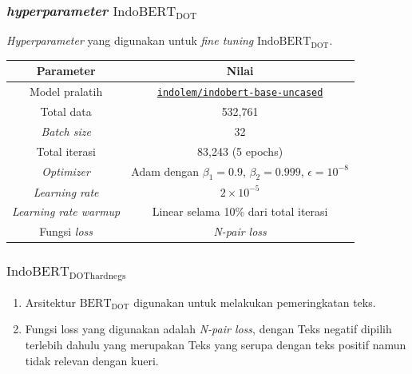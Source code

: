\documentclass[10pt]{beamer}
\newcommand{\f}[1]{\textit{#1}}
\newcommand{\code}[1]{\texttt{#1}}
\begin{document}
\begin{frame}
    \frametitle{\f{hyperparameter} $\text{IndoBERT}_{\text{DOT}}$}
    \f{Hyperparameter} yang digunakan untuk \f{fine tuning }$\text{IndoBERT}_{\text{DOT}}$.
    \begin{table}[!ht]
        \centering
        \small        
        \label{tab:indobert-dot-hyperparameter}
        \begin{tabular}{|c|c|}
            \hline
            \textbf{Parameter}       & \textbf{Nilai}                                                                                    \\
            \hline
            Model pralatih           & \href{https://huggingface.co/indolem/indobert-base-uncased}{\code{indolem/indobert-base-uncased}} \\
            \hline
            Total data               & 532,761                                                                                           \\
            \hline
            \f{Batch size}           & 32                                                                                                \\
            \hline
            Total iterasi            & 83,243 (5 epochs)                                                                                  \\
            \hline
            \f{Optimizer}            & Adam dengan $\beta_1 = 0.9$, $\beta_2 = 0.999$, $\epsilon = 10^{-8}$                                 \\
            \hline
            \f{Learning rate}        & $2\times 10^{-5}$                                                                                              \\
            \hline
            \f{Learning rate warmup} & Linear selama 10\% dari total iterasi                                                             \\
            \hline
            Fungsi \f{loss}          & \f{N-pair loss}                                                                                   \\
            \hline
        \end{tabular}
    \end{table}

    
\end{frame}


\begin{frame}
    \frametitle{$\text{IndoBERT}_{\text{DOThardnegs}}$}
    \begin{enumerate}
        \item Arsitektur $\text{BERT}_\text{DOT}$ digunakan untuk melakukan pemeringkatan teks.
        \item Fungsi loss yang digunakan adalah \f{N-pair loss}, dengan Teks negatif dipilih terlebih dahulu yang merupakan Teks yang serupa dengan teks positif namun tidak relevan dengan kueri.
    \end{enumerate}
\end{frame}
\end{document}

